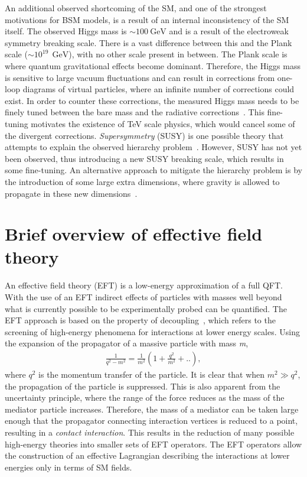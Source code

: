 An additional observed shortcoming of the SM, and one of the strongest motivations for BSM models, is a result of an internal inconsistency of the SM itself. The observed Higgs mass is $\sim \SI{100}{\giga\electronvolt}$ and is a result of the electroweak symmetry breaking scale. There is a vast difference between this and the Plank scale ($\sim 10^{19}~\SI{}{\giga\electronvolt}$), with no other scale present in between. The Plank scale is where quantum gravitational effects become dominant. Therefore, the Higgs mass is sensitive to large vacuum fluctuations and can result in corrections from one-loop diagrams of virtual particles, where an infinite number of corrections could exist. In order to counter these corrections, the measured Higgs mass needs to be finely tuned between the bare mass and the radiative corrections~\cite{Giudice_2008}. This fine-tuning motivates the existence of TeV scale physics, which would cancel some of the divergent corrections. \emph{Supersymmetry} (SUSY) is one possible theory that attempts to explain the observed hierarchy problem~\cite{MARTIN_1998}. However, SUSY has not yet been observed, thus introducing a new SUSY breaking scale, which results in some fine-tuning. An alternative approach to mitigate the hierarchy problem is by the introduction of some large extra dimensions, where gravity is allowed to propagate in these new dimensions~\cite{Arkani_Hamed_1998}. 

\section{Brief overview of effective field theory}\label{sec:bsm:eft}
An effective field theory (EFT) is a low-energy approximation of a full QFT. With the use of an EFT indirect effects of particles with masses well beyond what is currently possible to be experimentally probed can be quantified. The EFT approach is based on the property of decoupling~\cite{manohar2018introduction}, which refers to the screening of high-energy phenomena for interactions at lower energy scales. Using the expansion of the propagator of a massive particle with mass \emph{m}, 
\begin{equation}
    \label{eq:propogator}
    \begin{aligned}
        \frac{1}{q^2 - m^2} = \frac{1}{m^2}(1 + \frac{q^2}{m^2} + ..),
     \end{aligned}
\end{equation}
where $q^2$ is the momentum transfer of the particle. It is clear that when $m^2 \gg q^2$, the propagation of the particle is suppressed. This is also apparent from the uncertainty principle, where the range of the force reduces as the mass of the mediator particle increases. Therefore, the mass of a mediator can be taken large enough that the propagator connecting interaction vertices is reduced to a point, resulting in a \emph{contact interaction}. This results in the reduction of many possible high-energy theories into smaller sets of EFT operators. The EFT operators allow the construction of an effective Lagrangian describing the interactions at lower energies only in terms of SM fields. 

